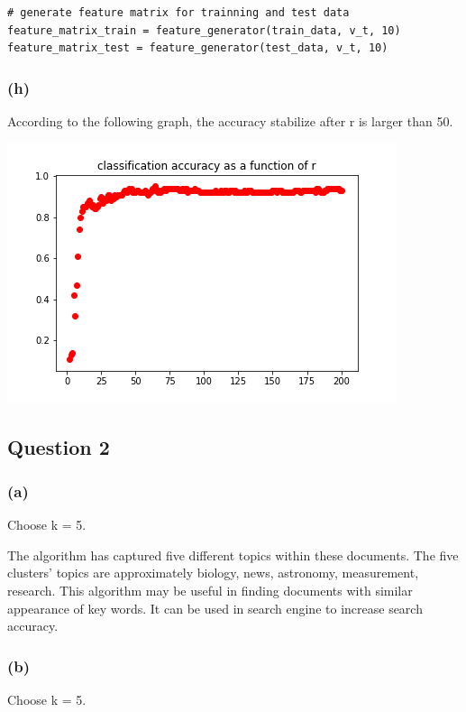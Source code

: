 \documentclass[12pt]{article}
\begin{document}
{\begin{lstlisting}
# generate feature matrix for trainning and test data 
feature_matrix_train = feature_generator(train_data, v_t, 10)
feature_matrix_test = feature_generator(test_data, v_t, 10)
\end{lstlisting}

\subsubsection*{(h)}
According to the following graph, the accuracy stabilize after r is larger than 50. 
\begin{center}
\includegraphics[scale=0.8]{P1/accuracy_over_r.png}
\end{center}

\subsection*{Question 2}
\subsubsection*{(a)}
Choose k = 5. 


\medskip


The algorithm has captured five different topics within these documents. The five clusters' topics are approximately biology, news, astronomy, measurement, research. This algorithm may be useful in finding documents with similar appearance of key words. It can be used in search engine to increase search accuracy.

\subsubsection*{(b)}
Choose k = 5.


}
\end{document}

